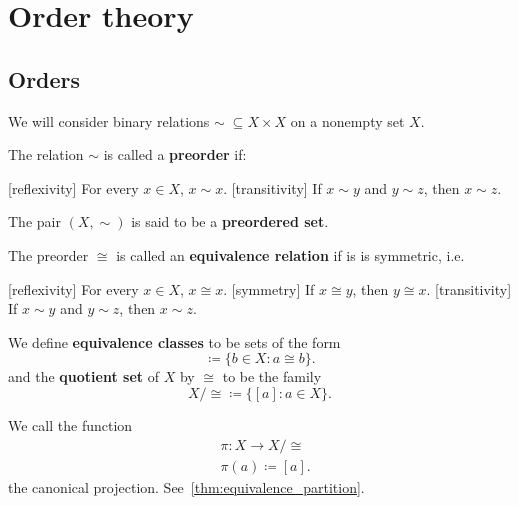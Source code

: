 \section{Order theory}\label{sec:order_theory}
\subsection{Orders}\label{subsec:orders}

\begin{definition}\label{def:order}
  We will consider binary relations \( \sim\; \subseteq X \times X \) on a nonempty set \( X \).

  \begin{defenum}
    \cite{nLab:preorder} The relation \( \sim \) is called a \textbf{preorder} if:
    \begin{description}
      [reflexivity] For every \( x \in X \), \( x \sim x \).
      [transitivity] If \( x \sim y \) and \( y \sim z \), then \( x \sim z \).
    \end{description}

    The pair \( (X, \sim) \) is said to be a \textbf{preordered set}.

    \cite[56]{Enderton1977} The preorder \( \cong \) is called an \textbf{equivalence relation} if is is symmetric, i.e.
    \begin{description}
      [reflexivity] For every \( x \in X \), \( x \cong x \).
      [symmetry] If \( x \cong y \), then \( y \cong x \).
      [transitivity] If \( x \sim y \) and \( y \sim z \), then \( x \sim z \).
    \end{description}

    We define \textbf{equivalence classes} to be sets of the form
    \begin{equation*}
      [a] \coloneqq \{ b \in X \colon a \cong b \}.
    \end{equation*}
    and the \textbf{quotient set} of \( X \) by \( \cong \) to be the family
    \begin{equation*}
      X / \cong \coloneqq \{ [a] \colon a \in X \}.
    \end{equation*}

    We call the function
    \begin{align*}
      &\pi: X \to X / \cong \\
      &\pi(a) \coloneqq [a].
    \end{align*}
    the canonical projection. See~\cref{thm:equivalence_partition}.


\end{defenum}
\end{definition}
